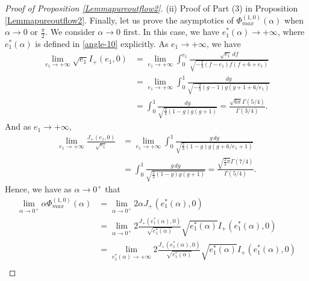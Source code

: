 \documentclass[reqno,12pt]{amsart}
\begin{document}
\begin{proof} [Proof of Proposition \ref{Lemmapureoutflow2}]
(ii) Proof of Part (3) in Proposition \ref{Lemmapureoutflow2}.
Finally, let us prove the asymptotics of  $\Phi_{max}^{(1, 0)} (\alpha)$ when $\alpha\to 0$ or $\frac{\pi}{2}$. 
We consider  $\alpha\to 0$ first. In this case, we have $e_1^*(\alpha) \to +\infty$, where  $e_1^*(\alpha)$ is defined in \eqref{angle-10} explicitly.
As $e_1\to +\infty$, we have
\begin{equation} \label{eq:asy1}
\begin{aligned}
    \lim_{e_1\to +\infty} \sqrt{e_1} I_{+}(e_1, 0)& =   \lim_{e_1\to +\infty}\int_0^{e_1} \frac{\sqrt{e_1} \, df}{\sqrt{-\frac23 (f-e_1)f (f+ 6 + e_1)}}\\
  & =  \lim_{e_1\to +\infty}\int_0^1 \frac{dg}{\sqrt{-\frac23 (g-1) g (g +1+ 6/e_1 )}} \\
   & =  \int_0^1 \frac{dg}{\sqrt{\frac23 (1-g) g (g +1 )}}  = \frac{\sqrt{6\pi}  \Gamma(5/4) }{  \Gamma(3/4) }.
\end{aligned}
\end{equation}
And as $e_1\to +\infty$,
\begin{equation}\label{eq:asy2}
    \begin{aligned}
      \lim_{e_1\to +\infty} \frac{ J_{+}(e_1, 0)}{\sqrt{e_1}} &= \lim_{e_1\to +\infty} \int_0^1 \frac{ g\, dg}{\sqrt{\frac23(1-g) g (g+ 6/e_1 + 1)}}  \\
   &= \int_0^1 \frac{g \, dg}{\sqrt{\frac23 (1-g) g (g +1 )}}  = \frac{\sqrt{\frac{2}{3}\pi}  \Gamma(7/4) }{  \Gamma(5/4) }.   
    \end{aligned}
\end{equation}
Hence, we  have as $\alpha \to 0^+$ that
\begin{align*}
   \lim_{\alpha \to 0^+} \alpha \Phi_{max}^{(1, 0) }(\alpha) &=  \lim_{\alpha \to 0^+} 2 \alpha   J_{+}(e_1^*(\alpha), 0) \\
   &= \lim_{\alpha \to 0^+} 2\frac{ J_{+}(e_1^*(\alpha), 0)}{\sqrt{e_1^*(\alpha)}}\sqrt{e_1^*(\alpha)} I_{+}(e_1^*(\alpha), 0)\\
   &= \lim_{e_1^*(\alpha) \to +\infty} 2\frac{ J_{+}(e_1^*(\alpha), 0)}{\sqrt{e_1^*(\alpha)}}\sqrt{e_1^*(\alpha)} I_{+}(e_1^*(\alpha), 0)\\

\end{align*}
\end{proof}
\end{document}
